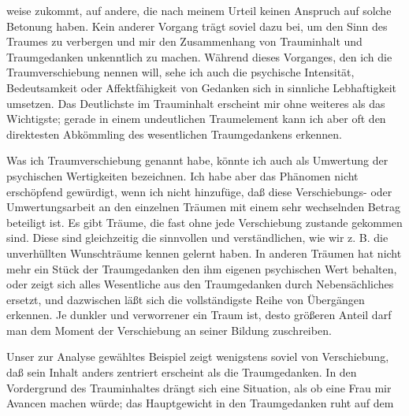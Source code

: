 \documentclass{article}
\begin{document}
         
            
            
            
        \pstart
        weise zukommt, auf andere, die nach meinem
                  Urteil keinen Anspruch auf solche Betonung haben. Kein anderer Vorgang trägt
               soviel dazu bei, um den Sinn des Traumes zu verbergen und mir den
               Zusammenhang von Trauminhalt und Traumgedanken unkenntlich zu machen.
               Während dieses Vorganges, den ich die Traumverschiebung nennen
               will, sehe ich auch die psychische Intensität, Bedeutsamkeit oder
               Affektfähigkeit von Gedanken sich in sinnliche Lebhaftigkeit
               umsetzen. Das Deutlichste im Trauminhalt erscheint mir ohne weiteres als das
               Wichtigste; gerade in einem undeutlichen Traumelement kann ich aber oft den
               direktesten Abkömmling des wesentlichen Traumgedankens erkennen.
        \pend
    
            
        \pstart
        Was ich Traumverschiebung genannt habe, könnte ich auch als Umwertung der psychischen Wertigkeiten
               bezeichnen. Ich habe aber das Phänomen nicht erschöpfend gewürdigt,
               wenn ich nicht hinzufüge, daß diese Verschiebungs- oder Umwertungsarbeit an den
               einzelnen Träumen mit einem sehr wechselnden Betrag beteiligt ist. Es gibt
               Träume, die fast ohne jede Verschiebung zustande gekommen sind. Diese sind
               gleichzeitig die sinnvollen und verständlichen, wie wir z. B. die
               unverhüllten Wunschträume kennen gelernt haben. In anderen Träumen hat
               nicht mehr ein Stück der Traumgedanken den ihm eigenen psychischen Wert
               behalten, oder zeigt sich alles Wesentliche aus den Traumgedanken durch
               Nebensächliches ersetzt, und dazwischen läßt sich die vollständigste Reihe von
               Übergängen erkennen. Je dunkler und verworrener ein Traum ist, desto
               größeren Anteil darf man dem Moment der Verschiebung an seiner Bildung
               zuschreiben.
        \pend
    
            
        \pstart
        Unser zur Analyse gewähltes Beispiel zeigt wenigstens soviel von Verschiebung,
               daß sein Inhalt anders zentriert erscheint als
               die Traumgedanken. In den Vordergrund des Trauminhaltes drängt sich eine
               Situation, als ob eine Frau mir Avancen machen würde; das Hauptgewicht in den
               Traumgedanken ruht auf dem
        \pend
    
\end{document}
